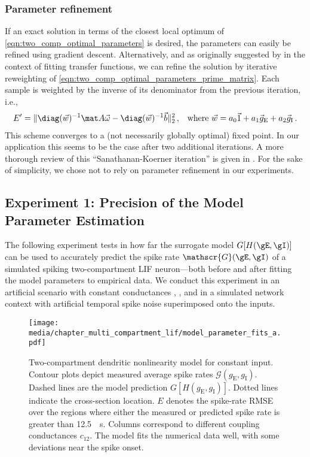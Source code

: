 \subsubsection{Parameter refinement}
If an exact solution in terms of the closest local optimum of \cref{eqn:two_comp_optimal_parameters} is desired, the parameters can easily be refined using gradient descent.
Alternatively, and as originally suggested by \citet{sanathanan1963transfer} in the context of fitting transfer functions, we can refine the solution by iterative reweighting of \cref{eqn:two_comp_optimal_parameters_prime_matrix}.
Each sample is weighted by the inverse of its denominator from the previous iteration, i.e.,
\begin{align}
	E' &= \|\diag(\vec w)^{-1} \mat A \vec \omega - \diag(\vec w)^{-1}\vec b \|_2^2 \,, & \text{where } \vec w = a_0 \vec{1} + a_1 \vec g_\mathrm{E} + a_2 \vec g_\mathrm{I} \,.
	\label{eqn:sanathanan_koerner}
\end{align}
This scheme converges to a (not necessarily globally optimal) fixed point.
In our application this seems to be the case after two additional iterations.
A more thorough review of this \enquote{Sanathanan-Koerner iteration} is given in \citet[Section~2.2]{hokanson2018least}.
For the sake of simplicity, we chose not to rely on parameter refinement in our experiments.

\subsection{Experiment 1: Precision of the Model Parameter Estimation}
\label{sec:two_comp_lif_experiment_1}

The following experiment tests in how far the surrogate model $G[H(\gE, \gI)]$ can be used to accurately predict the spike rate $\mathscr{G}(\gE, \gI)$ of a simulated spiking two-com\-part\-ment LIF neuron---both before and after fitting the model parameters to empirical data.
We conduct this experiment in an artificial scenario with constant conductances \gE, \gI, and in a simulated network context with artificial temporal spike noise superimposed onto the inputs.

\begin{figure}[t]
	\texttt{[image: media/chapter\_multi\_compartment\_lif/model\_parameter\_fits\_a.pdf]}%
	{\label{fig:synaptic_nonlinearity_fit_a_a}}%
	{\label{fig:synaptic_nonlinearity_fit_a_b}}%
	\caption[Two-compartment dendritic nonlinearity model for constant input]{
		Two-compartment dendritic nonlinearity model for constant input. Contour plots depict measured average spike rates $\mathscr{G}(g_\mathrm{E}, g_\mathrm{I})$.
		Dashed lines are the model prediction $G[H(g_\mathrm{E}, g_\mathrm{I})]$. Dotted lines indicate the cross-section location.
		$E$ denotes the spike-rate RMSE over the regions where either the measured or predicted spike rate is greater than \SI{12.5}{\per\second}.
		Columns correspond to different coupling conductances $c_\mathrm{12}$.
		The model fits the numerical data well, with some deviations near the spike onset.}
	\label{fig:synaptic_nonlinearity_fit_a}%
\end{figure}

